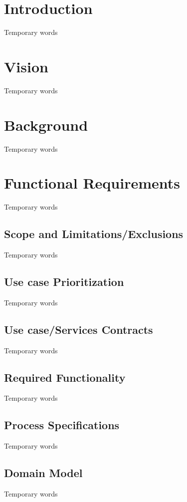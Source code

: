 \documentclass[11pt]{article}
\begin{document}


\tableofcontents
\newpage

\section{Introduction}
Temporary words
\section{Vision}
Temporary words
\section{Background}
Temporary words
\section{Functional Requirements}
Temporary words
\subsection{Scope and Limitations/Exclusions}
Temporary words
\subsection{Use case Prioritization}
Temporary words
\subsection{Use case/Services Contracts}
Temporary words
\subsection{Required Functionality}
Temporary words
\subsection{Process Specifications}
Temporary words
\subsection{Domain Model}
Temporary words
\end{document}
